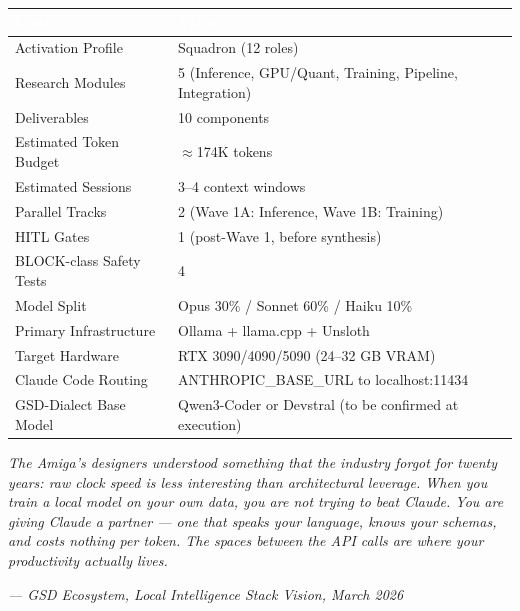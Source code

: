 \documentclass[11pt,letterpaper]{article}
\newcommand{\tableheader}[1]{\textbf{\sffamily\textcolor{white}{#1}}}
\begin{document}
\begin{center}
\begin{tabularx}{\textwidth}{L{4cm}X}
\toprule
{}
\tableheader{Metric} & \tableheader{Value} \\
\midrule
Activation Profile & Squadron (12 roles) \\
Research Modules & 5 (Inference, GPU/Quant, Training, Pipeline, Integration) \\
Deliverables & 10 components \\
Estimated Token Budget & $\approx$174K tokens \\
Estimated Sessions & 3--4 context windows \\
Parallel Tracks & 2 (Wave 1A: Inference, Wave 1B: Training) \\
HITL Gates & 1 (post-Wave 1, before synthesis) \\
BLOCK-class Safety Tests & 4 \\
Model Split & Opus 30\% / Sonnet 60\% / Haiku 10\% \\
Primary Infrastructure & Ollama + llama.cpp + Unsloth \\
Target Hardware & RTX 3090/4090/5090 (24--32 GB VRAM) \\
Claude Code Routing & ANTHROPIC\_BASE\_URL to localhost:11434 \\
GSD-Dialect Base Model & Qwen3-Coder or Devstral (to be confirmed at execution) \\
\bottomrule
\end{tabularx}
\end{center}

\vspace{2em}

\begin{quotebox}
\textit{\large The Amiga's designers understood something that the industry forgot for twenty years: raw clock speed is less interesting than architectural leverage. When you train a local model on your own data, you are not trying to beat Claude. You are giving Claude a partner --- one that speaks your language, knows your schemas, and costs nothing per token. The spaces between the API calls are where your productivity actually lives.}

\vspace{0.8em}
\textit{--- GSD Ecosystem, Local Intelligence Stack Vision, March 2026}
\end{quotebox}
\end{document}
